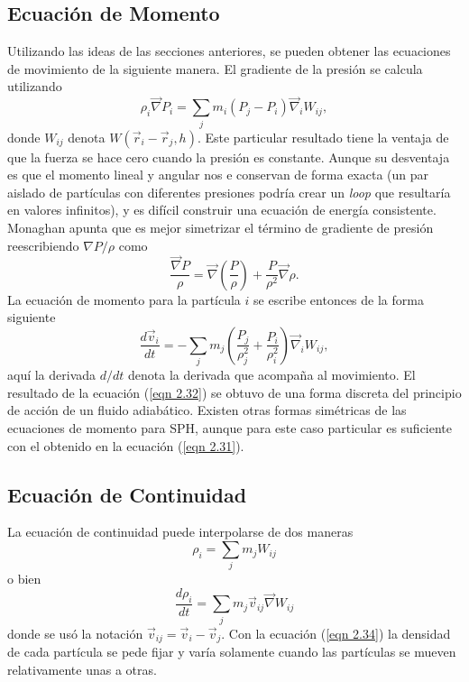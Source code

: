 \documentclass[a4paper,openright,12pt]{book}
\begin{document}
\subsection{Ecuación de Momento}
Utilizando las ideas de las secciones anteriores, se pueden obtener las ecuaciones de movimiento de la siguiente manera. El gradiente de la presión se calcula utilizando 
\begin{equation}
\rho_{i} \vec{\nabla} P_{i}
=
\sum_{j} m_{i} (P_{j}-P_{i})\vec{\nabla}_{i}W_{ij},\label{eqn 2.30}
\end{equation}
donde $W_{ij}$ denota $W(\vec{r}_{i}-\vec{r}_{j},h)$. Este particular resultado tiene la ventaja de que la fuerza se hace cero cuando la presión es constante. Aunque su desventaja es que el momento lineal y angular nos e conservan de forma exacta (un par aislado de partículas con diferentes presiones podría crear un \textit{loop} que resultaría en valores infinitos), y es difícil construir una ecuación de energía consistente. Monaghan apunta que es mejor simetrizar el término de gradiente de presión reescribiendo $\nabla P / \rho$ como 
\begin{equation}
\frac{\vec{\nabla} P}{\rho} 
=
\vec{\nabla} \left(\frac{P}{\rho}\right)
+ \frac{P}{\rho^{2}}\vec{\nabla}\rho.\label{eqn 2.31}
\end{equation}
La ecuación de momento para la partícula $i$ se escribe entonces de la forma siguiente
\begin{equation}
\frac{d \vec{v}_{i}}{d t}
=
- \sum_{j} m_{j} 
\left(\frac{P_{j}}{\rho_{j}^{2}}+ \frac{P_{i}}{\rho_{i}^{2}}\right)
\vec{\nabla}_{i}W_{ij}, \label{eqn 2.32}
\end{equation}
aquí la derivada $d/dt$ denota la derivada que acompaña al movimiento. El resultado de la ecuación (\ref{eqn 2.32}) se obtuvo de una forma discreta del principio de acción de un fluido adiabático. Existen otras formas simétricas de las ecuaciones de momento para SPH, aunque para este caso particular es suficiente con el obtenido en la ecuación (\ref{eqn 2.31}).

\subsection{Ecuación de Continuidad}
La ecuación de continuidad puede interpolarse de dos maneras
\begin{equation}
\rho_{i}=\sum_{j}m_{j}W_{ij}\label{eqn 2.33}
\end{equation}
o bien
\begin{equation}
\frac{d\rho_{i}}{d t}
=
\sum_{j}m_{j}\vec{v}_{ij}\vec{\nabla}W_{ij}\label{eqn 2.34}
\end{equation}
donde se usó la notación $\vec{v}_{ij} = \vec{v}_{i}-\vec{v}_{j}$. Con la ecuación (\ref{eqn 2.34}) la densidad de cada partícula se pede fijar y varía solamente cuando las partículas se mueven relativamente unas a otras.
\end{document}
